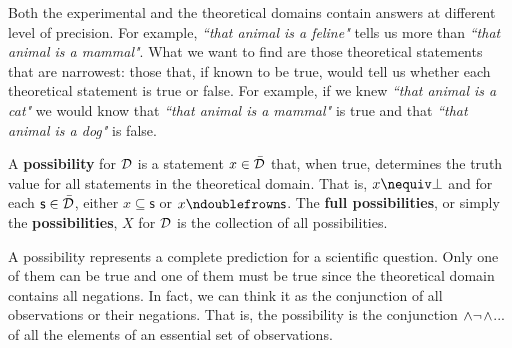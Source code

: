 \documentclass[11pt,letterpaper,fleqn]{memoir} %
\begin{document}
Both the experimental and the theoretical domains contain answers at different level of precision. For example, \emph{``that animal is a feline"} tells us more than \emph{``that animal is a mammal"}. What we want to find are those theoretical statements that are narrowest: those that, if known to be true, would tell us whether each theoretical statement is true or false. For example, if we knew \emph{``that animal is a cat"} we would know that \emph{``that animal is a mammal"} is true and that \emph{``that animal is a dog"} is false.

\begin{mathSection}

\begin{defn}
	A \textbf{possibility} for $\mathcal{D}$ is a statement $x \in \bar{\mathcal{D}}$ that, when true, determines the truth value for all statements in the theoretical domain. That is, $x \nequiv \contradiction$ and for each $\mathsf{s} \in \bar{\mathcal{D}}$, either $x \subseteq \mathsf{s}$ or $x \ncomp \mathsf{s}$. The \textbf{full possibilities}, or simply the \textbf{possibilities}, $X$ for $\mathcal{D}$ is the collection of all possibilities.
\end{defn}

\end{mathSection}

A possibility represents a complete prediction for a scientific question. Only one of them can be true and one of them must be true since the theoretical domain contains all negations. In fact, we can think it as the conjunction of all observations or their negations. That is, the possibility  is the conjunction $\wedge \neg$$\wedge$... of all the elements of an essential set of observations.
\end{document}

